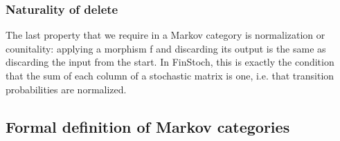 \begin{frame}
    \frametitle{Naturality of delete}
The last property that we require in a Markov category is normalization or counitality: applying a morphism f and discarding its output is the same as discarding the input from the start.  In FinStoch, this is exactly the condition that the sum of each column of a stochastic matrix is one, i.e. that transition probabilities are normalized.
\end{frame}

\subsection{Formal definition of Markov categories}

